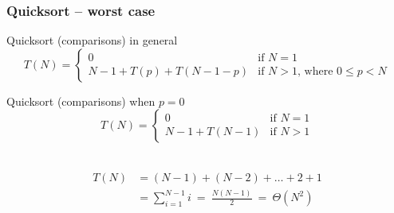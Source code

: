 \documentclass[aspectratio=169]{beamer}
\begin{document}
\begin{frame}\frametitle{Quicksort -- worst case}

  \begin{block}{Quicksort (comparisons) in general}
  $$T(N) = \left\{
    \begin{array}{ll}
      0 & \text{if }N=1
      \\
      N-1 + T(p) + T(N-1-p) & \text{if }N>1\text{, where }0\leq p < N
    \end{array}
  \right.$$
  \end{block}

  \begin{alertblock}{Quicksort (comparisons) when $p=0$}
  $$T(N) = \left\{
    \begin{array}{ll}
      0 & \text{if }N=1
      \\
      N-1 + T(N-1) & \text{if }N>1
    \end{array}
  \right.$$
  \end{alertblock}

  \pause~\\[-8mm]
  \begin{align*}
    T(N) &= (N-1)+(N-2)+\ldots+2+1
       \\&= \sum_{i=1}^{N-1} i ~=~ \frac{N(N-1)}{2} ~=~ \Theta(N^2)
  \end{align*}
\end{frame}
\end{document}
